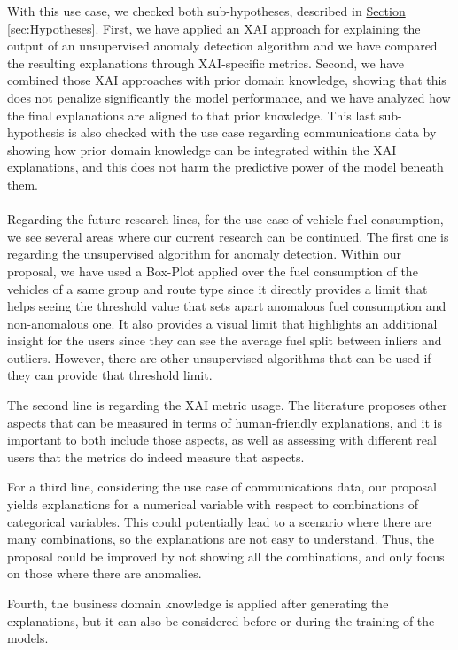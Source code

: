 With this use case, we checked both sub-hypotheses, described in \hyperref[sec:Hypotheses]{Section} \ref{sec:Hypotheses}. First, we have applied an XAI approach for explaining the output of an unsupervised anomaly detection algorithm and we have compared the resulting explanations through XAI-specific metrics. Second, we have combined those XAI approaches with prior domain knowledge, showing that this does not penalize significantly the model performance, and we have analyzed how the final explanations are aligned to that prior knowledge. This last sub-hypothesis is also checked with the use case regarding communications data by showing how prior domain knowledge can be integrated within the XAI explanations, and this does not harm the predictive power of the model beneath them.
\\
\\
Regarding the future research lines, for the use case of vehicle fuel consumption, we see several areas where our current research can be continued. The first one is regarding the unsupervised algorithm for anomaly detection. Within our proposal, we have used a Box-Plot applied over the fuel consumption of the vehicles of a same group and route type since it directly provides a limit that helps seeing the threshold value that sets apart anomalous fuel consumption and non-anomalous one. It also provides a visual limit that highlights an additional insight for the users since they can see the average fuel split between inliers and outliers. However, there are other unsupervised algorithms that can be used if they can provide that threshold limit.

The second line is regarding the XAI metric usage. The literature proposes other aspects that can be measured in terms of human-friendly explanations, and it is important to both include those aspects, as well as assessing with different real users that the metrics do indeed measure that aspects.

For a third line, considering the use case of communications data, our proposal yields explanations for a numerical variable with respect to combinations of categorical variables. This could potentially lead to a scenario where there are many combinations, so the explanations are not easy to understand. Thus, the proposal could be improved by not showing all the combinations, and only focus on those where there are anomalies.

Fourth, the business domain knowledge is applied after generating the explanations, but it can also be considered before or during the training of the models. 

